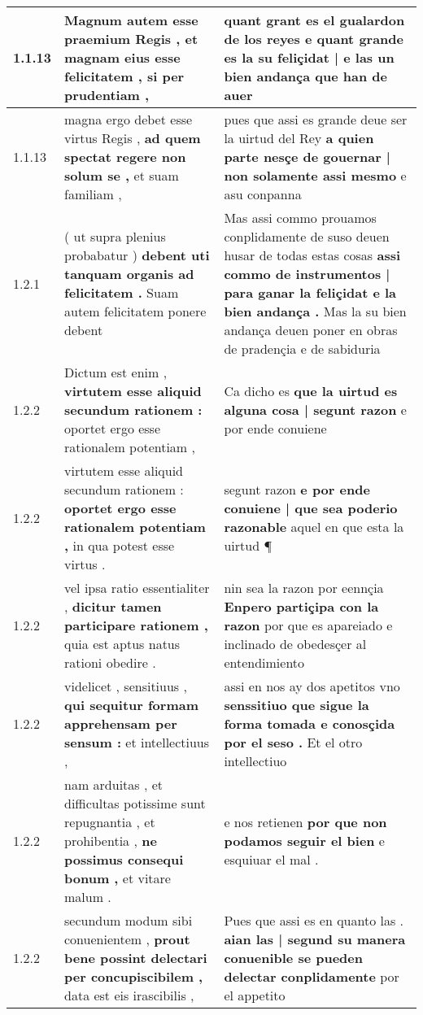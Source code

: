 \begin{tabular}{|p{1cm}|p{6.5cm}|p{6.5cm}|}
1.1.13 & Magnum autem esse praemium Regis , \textbf{ et magnam eius esse felicitatem , } si per prudentiam , & quant grant es el gualardon de los reyes \textbf{ e quant grande es la su feliçidat | e las un bien andança } que han de auer \\\hline
1.1.13 & magna ergo debet esse virtus Regis , \textbf{ ad quem spectat regere non solum se , } et suam familiam , & pues que assi es grande deue ser la uirtud del Rey \textbf{ a quien parte nesçe de gouernar | non solamente assi mesmo } e asu conpanna \\\hline
1.2.1 & ( ut supra plenius probabatur ) \textbf{ debent uti tanquam organis ad felicitatem . } Suam autem felicitatem ponere debent & Mas assi commo prouamos conplidamente de suso deuen husar de todas estas cosas \textbf{ assi commo de instrumentos | para ganar la feliçidat e la bien andança . } Mas la su bien andança deuen poner en obras de pradençia e de sabiduria \\\hline
1.2.2 & Dictum est enim , \textbf{ virtutem esse aliquid secundum rationem : } oportet ergo esse rationalem potentiam , & Ca dicho es \textbf{ que la uirtud es alguna cosa | segunt razon } e por ende conuiene \\\hline
1.2.2 & virtutem esse aliquid secundum rationem : \textbf{ oportet ergo esse rationalem potentiam , } in qua potest esse virtus . & segunt razon \textbf{ e por ende conuiene | que sea poderio razonable } aquel en que esta la uirtud ¶ \\\hline
1.2.2 & vel ipsa ratio essentialiter , \textbf{ dicitur tamen participare rationem , } quia est aptus natus rationi obedire . & nin sea la razon por eennçia \textbf{ Enpero partiçipa con la razon } por que es apareiado e inclinado de obedesçer al entendimiento \\\hline
1.2.2 & videlicet , sensitiuus , \textbf{ qui sequitur formam apprehensam per sensum : } et intellectiuus , & assi en nos ay dos apetitos vno \textbf{ senssitiuo que sigue la forma tomada e conosçida por el seso . } Et el otro intellectiuo \\\hline
1.2.2 & nam arduitas , et difficultas potissime sunt repugnantia , et prohibentia , \textbf{ ne possimus consequi bonum , } et vitare malum . & e nos retienen \textbf{ por que non podamos seguir el bien } e esquiuar el mal . \\\hline
1.2.2 & secundum modum sibi conuenientem , \textbf{ prout bene possint delectari per concupiscibilem , } data est eis irascibilis , & Pues que assi es en quanto las . \textbf{ aian las | segund su manera conuenible se pueden delectar conplidamente } por el appetito \\\hline

\end{tabular}
